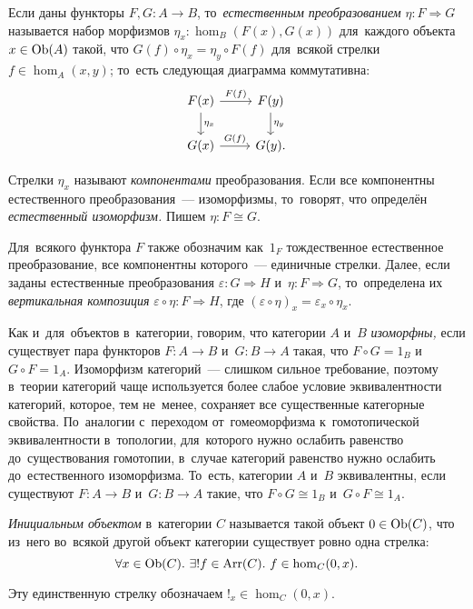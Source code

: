 \documentclass[a4paper,oneside]{article}
\begin{document}
Если даны функторы $F, G : A \rightarrow B$, то~\textit{естественным преобразованием} $\eta : F \Rightarrow G$ называется набор морфизмов
$\eta_x : \hom_B(F(x), G(x))$ для~каждого объекта $x \in \mathrm{Ob}(A)$ такой, что $G(f) \circ \eta_x = \eta_y \circ F(f)$
для~всякой стрелки $f \in \hom_A(x, y)$; то~есть следующая диаграмма коммутативна:
\[
  \begin{tikzcd}
    \arrow{d}{\eta_x} F(x) \arrow{r}{F(f)} & F(y) \arrow{d}{\eta_y} \\
                      G(x) \arrow{r}{G(f)} & G(y).
  \end{tikzcd}
\]

Стрелки $\eta_x$ называют \textit{компонентами} преобразования. Если все компонентны естественного
преобразования~— изоморфизмы, то~говорят, что определён \textit{естественный изоморфизм.} Пишем $\eta : F \cong G$.

Для~всякого функтора $F$ также обозначим как~$1_F$ тождественное естественное преобразование, все компонентны которого~— единичные стрелки.
Далее, если заданы естественные преобразования $\varepsilon : G \Rightarrow H$ и~$\eta : F \Rightarrow G$,
то~определена их \textit{вертикальная композиция} $\varepsilon \circ \eta : F \Rightarrow H$,
где $(\varepsilon \circ \eta)_x = \varepsilon_x \circ \eta_x$.

Как и~для~объектов в~категории, говорим, что категории $A$ и~$B$ \textit{изоморфны,} если существует
пара функторов $F : A \rightarrow B$ и~$G : B \rightarrow A$ такая, что $F \circ G = 1_B$ и~$G \circ F = 1_A$.
Изоморфизм категорий~— слишком сильное требование, поэтому в~теории категорий чаще используется более слабое
условие эквивалентности категорий, которое, тем не~менее, сохраняет все существенные категорные свойства.
По~аналогии с~переходом от~гомеоморфизма к~гомотопической эквивалентности в~топологии, для~которого нужно ослабить
равенство до~существования гомотопии, в~случае категорий равенство нужно ослабить до~естественного изоморфизма.
То~есть, категории $A$ и~$B$ эквивалентны, если существуют $F : A \rightarrow B$ и~$G : B \rightarrow A$
такие, что $F \circ G \cong 1_B$ и~$G \circ F \cong 1_A$.

\textit{Инициальным объектом} в~категории $C$ называется такой объект $0 \in \mathrm{Ob}(C)$,
что из~него во~всякой другой объект категории существует ровно одна стрелка:
\[
  \forall x \in \mathrm{Ob}(C).\ \exists! f \in \mathrm{Arr}(C).\ f \in \hom_C(0, x).
\]

Эту единственную стрелку обозначаем $!_x \in \hom_C(0, x)$.
\end{document}
